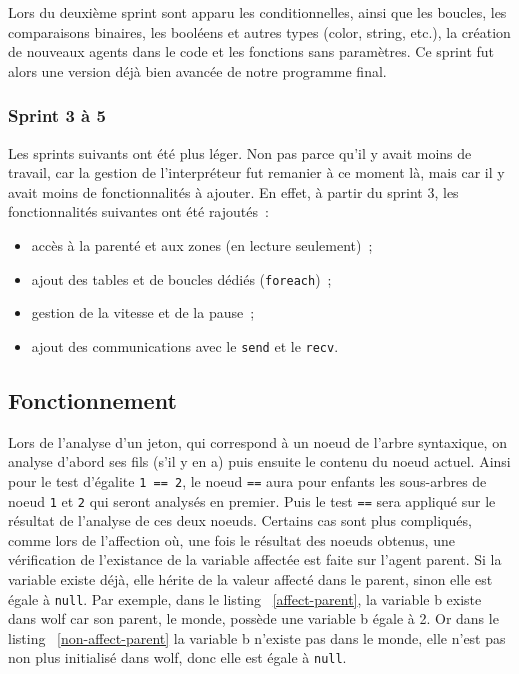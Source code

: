 Lors du deuxième sprint sont apparu les conditionnelles, ainsi que les boucles, les comparaisons binaires, les booléens et autres types (color, string, etc.), la création de nouveaux agents dans le code et les fonctions sans paramètres. Ce sprint fut alors une version déjà bien avancée de notre programme final.


\subsubsection{Sprint 3 à 5}
Les sprints suivants ont été plus léger. Non pas parce qu'il y avait moins de travail, car la gestion de l'interpréteur fut remanier à ce moment là, mais car il y avait moins de fonctionnalités à ajouter. En effet, à partir du sprint 3, les fonctionnalités suivantes ont été rajoutés~:
\begin{itemize}
\item accès à la parenté et aux zones (en lecture seulement)~;
\item ajout des tables et de boucles dédiés (\verb|foreach|)~;
\item gestion de la vitesse et de la pause~;
\item ajout des communications avec le \verb|send| et le \verb|recv|.
\end{itemize}


\subsection{Fonctionnement}
Lors de l'analyse d'un jeton, qui correspond à un noeud de l'arbre syntaxique, on analyse d'abord ses fils (s'il y en a) puis ensuite le contenu du noeud actuel.
Ainsi pour le test d'égalite \verb|1 == 2|, le noeud \verb|==| aura pour enfants les sous-arbres de noeud \verb|1| et \verb|2| qui seront analysés en premier. Puis le test \verb|==| sera appliqué sur le résultat de l'analyse de ces deux noeuds.
Certains cas sont plus compliqués, comme lors de l'affection où, une fois le résultat des noeuds obtenus, une vérification de l'existance de la variable affectée est faite sur l'agent parent. Si la variable existe déjà, elle hérite de la valeur affecté dans le parent, sinon elle est égale à \verb|null|.
Par exemple, dans le listing ~\ref{affect-parent}, la variable b existe dans wolf car son parent, le monde, possède une variable b égale à 2. Or dans le listing ~\ref{non-affect-parent} la variable b n'existe pas dans le monde, elle n'est pas non plus initialisé dans wolf, donc elle est égale à \verb|null|.

